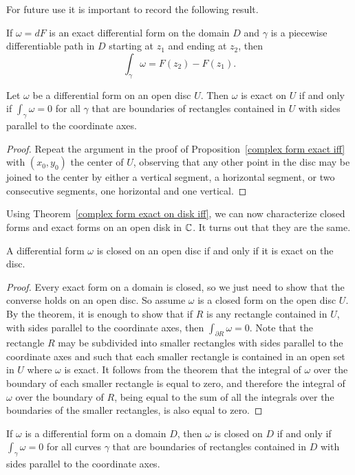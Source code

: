 For future use it is important to record the following result.
\begin{corollary}
If $\omega=dF$ is an exact differential form on the domain $D$ and $\gamma$ is a piecewise differentiable path in $D$ starting at $z_1$ and ending at $z_2$, then
\[\int_{\gamma}\omega=F(z_2)-F(z_1).\]
\end{corollary}
\begin{theorem}\label{complex form exact on disk iff}
Let $\omega$ be a differential form on an open disc $U$. Then $\omega$ is exact on $U$ if and only if $\int_{\gamma}\omega=0$ for all $\gamma$ that are boundaries of rectangles contained in $U$ with sides parallel to the coordinate axes.
\end{theorem}
\begin{proof}
Repeat the argument in the proof of Proposition~\ref{complex form exact iff} with $(x_0,y_0)$ the center of $U$, observing that any other point in the disc may be joined to the center by either a vertical segment, a horizontal segment, or two consecutive segments, one horizontal and one vertical.
\end{proof}
Using Theorem~\ref{complex form exact on disk iff}, we can now characterize closed forms and exact forms on an open disk in $\mathbb{C}$. It turns out that they are the same.
\begin{proposition}\label{complex form closed on disk iff exact}
A differential form $\omega$ is closed on an open disc if and only if it is exact on the disc.
\end{proposition}
\begin{proof}
Every exact form on a domain is closed, so we just need to show that the converse holds on an open disc. So assume $\omega$ is a closed form on the open disc $U$. By the theorem, it is enough to show that if $R$ is any rectangle contained in $U$, with sides parallel to the coordinate axes, then $\int_{\partial R}\omega=0$. Note that the rectangle $R$ may be subdivided into smaller rectangles with sides parallel to the coordinate axes and such that each smaller rectangle is contained in an open set in $U$ where $\omega$ is exact. It follows from the theorem that the integral of $\omega$ over the boundary of each smaller rectangle is equal to zero, and therefore the integral of $\omega$ over the boundary of $R$, being equal to the sum of all the integrals over the boundaries of the smaller rectangles, is also equal to zero.
\end{proof}
\begin{corollary}\label{complex form closed iff}
If $\omega$ is a differential form on a domain $D$, then $\omega$ is closed on $D$ if and only if $\int_{\gamma}\omega=0$ for all curves $\gamma$ that are boundaries of rectangles contained in $D$ with sides parallel to the coordinate axes.
\end{corollary}
